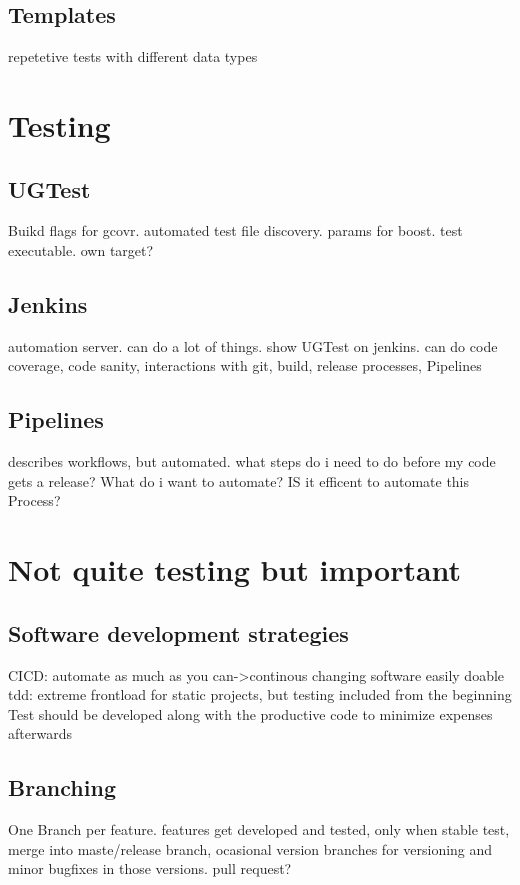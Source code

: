\documentclass[a4paper]{scrbook}
\begin{document}
        \subsection{Templates}
        repetetive tests with different data types
    \section{Testing}

        \subsection{UGTest}
        Buikd flags for gcovr. automated test file discovery. params for boost. test executable. own target?
        \subsection{Jenkins}
        automation server. can do a lot of things. show UGTest on jenkins. can do code coverage, code sanity, interactions with git, build, release processes, Pipelines
        \subsection{Pipelines}
        describes workflows, but automated. what steps do i need to do before my code gets a release? What do i want to automate? IS it efficent to automate this Process?
    \section{Not quite testing but important}

        \subsection{Software development strategies}
        CICD: automate as much as you can->continous changing software  easily doable
        tdd: extreme frontload for static projects, but testing included from the beginning\\
        Test should be developed along with the productive code to minimize expenses afterwards
        \subsection{Branching}
        One Branch per feature. features get developed and tested, only when stable test, merge into maste/release branch, ocasional version branches for versioning and minor bugfixes in those versions.
        pull request?
\end{document}
